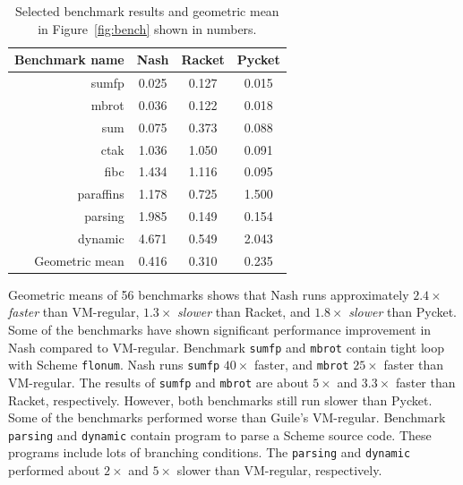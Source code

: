 \documentclass[preprint]{sigplanconf}
\begin{document}
\begin{table}
  \centering
  \begin{tabular}{rccc}
    \toprule
    Benchmark name & Nash & Racket & Pycket\\
    \midrule
    sumfp & 0.025 & 0.127 & 0.015 \\
    mbrot & 0.036 & 0.122 & 0.018 \\
    sum & 0.075 & 0.373 & 0.088 \\
    \midrule
    ctak & 1.036 & 1.050 & 0.091 \\
    fibc & 1.434 & 1.116 & 0.095 \\
    \midrule
    paraffins & 1.178 & 0.725 & 1.500 \\
    parsing & 1.985 & 0.149 & 0.154 \\
    dynamic & 4.671 & 0.549 & 2.043 \\
    \midrule
    Geometric mean & 0.416 & 0.310 & 0.235 \\
    \bottomrule
  \end{tabular}
  \caption{Selected benchmark results and geometric mean in
    Figure~\hyperref[fig:bench]{\ref{fig:bench}} shown in numbers.}
\label{tab:bench}
\end{table}

Geometric means of 56 benchmarks shows that Nash runs approximately $2.4\times$
\textit{faster} than VM-regular, $1.3\times$ \textit{slower} than Racket, and
$1.8\times$ \textit{slower} than Pycket.  Some of the benchmarks have shown
significant performance improvement in Nash compared to VM-regular. Benchmark
\texttt{sumfp} and \texttt{mbrot} contain tight loop with Scheme
\texttt{flonum}. Nash runs \texttt{sumfp} $40\times$ faster, and \texttt{mbrot}
$25\times$ faster than VM-regular. The results of \texttt{sumfp} and
\texttt{mbrot} are about $5\times$ and $3.3\times$ faster than Racket,
respectively. However, both benchmarks still run slower than Pycket.  Some of
the benchmarks performed worse than Guile's VM-regular. Benchmark
\texttt{parsing} and \texttt{dynamic} contain program to parse a Scheme source
code. These programs include lots of branching conditions. The \texttt{parsing}
and \texttt{dynamic} performed about $2\times$ and $5\times$ slower than
VM-regular, respectively.


\end{document}
